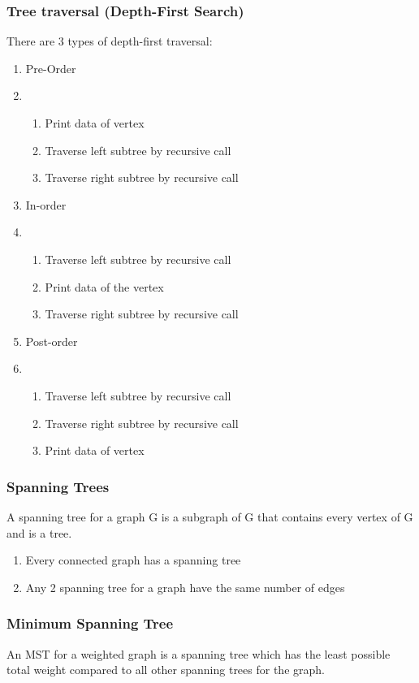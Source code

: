 \documentclass{article}
\begin{document}
\subsubsection{Tree traversal (Depth-First Search)}
There are 3 types of depth-first traversal:
\begin{enumerate}
    \item Pre-Order
    \item \begin{enumerate}
        \item Print data of vertex
        \item Traverse left subtree by recursive call
        \item Traverse right subtree by recursive call
    \end{enumerate}
    \item In-order
    \item \begin{enumerate}
        \item Traverse left subtree by recursive call
        \item Print data of the vertex
        \item Traverse right subtree by recursive call
    \end{enumerate}
    \item Post-order
    \item \begin{enumerate}
        \item Traverse left subtree by recursive call
        \item Traverse right subtree by recursive call
        \item Print data of vertex
    \end{enumerate}
\end{enumerate}

\subsubsection{Spanning Trees}
A spanning tree for a graph G is a subgraph of G that contains every vertex of G and is a tree.

\begin{enumerate}
    \item Every connected graph has a spanning tree
    \item Any 2 spanning tree for a graph have the same number of edges
\end{enumerate}

\subsubsection{Minimum Spanning Tree}
An MST for a weighted graph is a spanning tree which has the least possible total weight compared to all other spanning trees for the graph.
\end{document}
